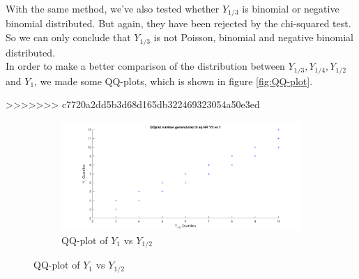 With the same method, we've also tested whether $Y_{1/3}$ is binomial or negative binomial distributed. 
But again, they have been rejected by the chi-squared test. 
So we can only conclude that $Y_{1/3}$ is not Poisson, binomial and negative binomial distributed.\\

In order to make a better comparison of the distribution between $Y_{1/3},Y_{1/4},Y_{1/2}$ and $Y_1$, we made some QQ-plots, which is shown in figure \ref{fig:QQ-plot}.
 
>>>>>>> c7720a2dd5b3d68d165db322469323054a50e3ed
\begin{figure}[H]
    \centering
    \begin{subfigure}{0.8\textwidth}
    \includegraphics[width=\textwidth]{QQplotATGEN3.pdf}
    \caption{QQ-plot of $Y_{1}$ vs $Y_{1/2}$}
        \label{fig:QQplotATGEN3}
    \end{subfigure}
    

\end{figure}
